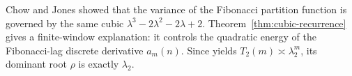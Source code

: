 \begin{remark}
\label{rem:chow-jones}
Chow and Jones \cite{ChowJones2024} showed that the variance of the Fibonacci
partition function is governed by the same cubic
\(\lambda^3-2\lambda^2-2\lambda+2\).  Theorem~\ref{thm:cubic-recurrence} gives
a finite-window explanation: it controls the quadratic energy of the
Fibonacci-lag discrete derivative \(a_m(n)\).  Since
 yields \(T_2(m)\asymp \lambda_2^m\), its dominant
root \(\rho\) is exactly \(\lambda_2\).
\end{remark}
